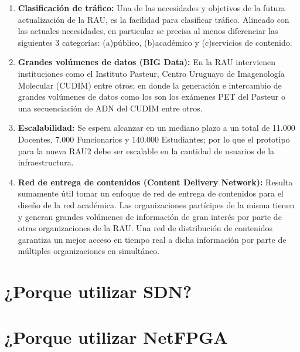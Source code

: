 \begin{enumerate}
\item \textbf{Clasificación de tráfico:} Una de las necesidades y objetivos de la futura actualizaci\'on de la RAU, es la facilidad para clasificar tráfico. Alineado con las actuales necesidades, en particular se precisa al menos diferenciar las siguientes 3 categorías: (a)público, (b)académico y (c)servicios de contenido.

\item \textbf{Grandes volúmenes de datos (BIG Data):} En la RAU intervienen instituciones como el Instituto Pasteur, Centro Uruguayo de Imagenología Molecular (CUDIM) entre otros; en donde la generación e intercambio de grandes volúmenes de datos como los son los exámenes PET del Pasteur o una secuenciación de ADN del CUDIM entre otros.

\item \textbf{Escalabilidad:} Se espera alcanzar en un mediano plazo a un total de 11.000 Docentes, 7.000 Funcionarios y 140.000 Estudiantes; por lo que el prototipo para la nueva RAU2 debe ser escalable en la cantidad de usuarios de la infraestructura.

\item \textbf{Red de entrega de contenidos (Content Delivery Network):} Resulta sumamente útil tomar un enfoque de red de entrega de contenidos para el diseño de la red académica. Las organizaciones partícipes de la misma tienen y generan grandes volúmenes de información de gran interés por parte de otras organizaciones de la RAU. Una red de distribución de contenidos garantiza un mejor acceso en tiempo real a dicha información por parte de múltiples organizaciones en simultáneo. 
 
\end{enumerate}

\section[Short title]{¿Porque utilizar SDN?}

\section[Short title]{¿Porque utilizar NetFPGA}

